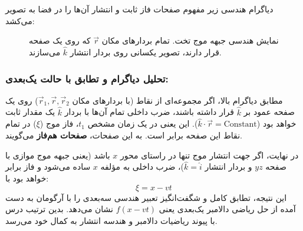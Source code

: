 \documentclass[12pt,a4paper]{article}
\begin{document}
دیاگرام هندسی زیر مفهوم صفحات فاز ثابت و انتشار آن‌ها را در فضا به تصویر می‌کشد:

\begin{figure}[h!]
\centering
{}
\caption{نمایش هندسی جبهه موج تخت. تمام بردارهای مکان $\vec{r}$ که روی یک صفحه قرار دارند، تصویر یکسانی روی بردار انتشار $\hat{k}$ می‌سازند.}
\label{fig:plane_wave}
\end{figure}

\subsubsection*{تحلیل دیاگرام و تطابق با حالت یک‌بعدی:}
مطابق دیاگرام بالا، اگر مجموعه‌ای از نقاط (با بردارهای مکان $\vec{r}_1, \vec{r}, \vec{r}_2$) روی یک صفحه عمود بر $\hat{k}$ قرار داشته باشند، ضرب داخلی تمام آن‌ها با بردار $\hat{k}$ یک مقدار ثابت خواهد بود ($\hat{k} \cdot \vec{r} = \text{Constant}$). این یعنی در یک زمان مشخص $t_1$، فاز موج ($\xi$) در تمام نقاط این صفحه برابر است. به این صفحات، \textbf{صفحات هم‌فاز } می‌گویند.

در نهایت، اگر جهت انتشار موج تنها در راستای محور $x$ باشد (یعنی جبهه موج موازی با صفحه $yz$ و بردار انتشار $\hat{k} = \hat{i}$)، ضرب داخلی به مؤلفه $x$ ساده می‌شود و فاز برابر خواهد بود با:
\begin{equation}
    \xi = x - vt
\end{equation}
این نتیجه، تطابق کامل و شگفت‌انگیز تعبیر هندسی سه‌بعدی را با آرگومان به دست آمده از حل ریاضی دالامبر یک‌بعدی یعنی $f(x-vt)$ نشان می‌دهد. بدین ترتیب درس با پیوند ریاضیات دالامبر و هندسه انتشار به کمال خود می‌رسد.
\end{document}
